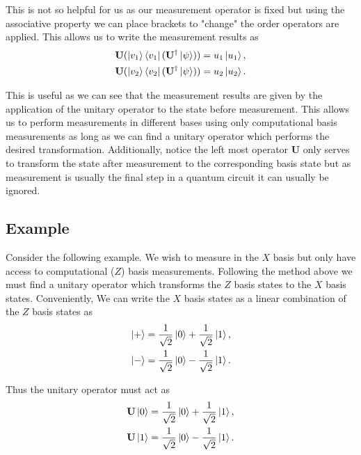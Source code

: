 \documentclass[12pt]{article}
\begin{document}
    This is not so helpful for us as our measurement operator is fixed but using the associative property we can place brackets to "change" the order operators are applied. This allows us to write the measurement results as
    \begin{align*}
        \mathbf{U} (\ket{v_1} \bra{v_1} (\mathbf{U}^\dagger \ket{\psi})) &= u_1 \ket{u_1}, \\
        \mathbf{U} (\ket{v_2} \bra{v_2} (\mathbf{U}^\dagger \ket{\psi})) &= u_2 \ket{u_2}.
    \end{align*}

    This is useful as we can see that the measurement results are given by the application of the unitary operator to the state before measurement. This allows us to perform measurements in different bases using only computational basis measurements as long as we can find a unitary operator which performs the desired transformation. Additionally, notice the left most operator $\mathbf{U}$ only serves to transform the state after measurement to the corresponding basis state but as measurement is usually the final step in a quantum circuit it can usually be ignored.

    \subsection{Example}
    Consider the following example. We wish to measure in the $X$ basis but only have access to computational ($Z$) basis measurements. Following the method above we must find a unitary operator which transforms the $Z$ basis states to the $X$ basis states. Conveniently, We can write the $X$ basis states as a linear combination of the $Z$ basis states as
    \begin{align*}
        \ket{+} &= \frac{1}{\sqrt{2}}\ket{0} + \frac{1}{\sqrt{2}}\ket{1}, \\
        \ket{-} &= \frac{1}{\sqrt{2}}\ket{0} - \frac{1}{\sqrt{2}}\ket{1}.
    \end{align*}

    Thus the unitary operator must act as
    \begin{align*}
        \mathbf{U} \ket{0} &= \frac{1}{\sqrt{2}}\ket{0} + \frac{1}{\sqrt{2}}\ket{1}, \\
        \mathbf{U} \ket{1} &= \frac{1}{\sqrt{2}}\ket{0} - \frac{1}{\sqrt{2}}\ket{1}.
    \end{align*}
\end{document}
